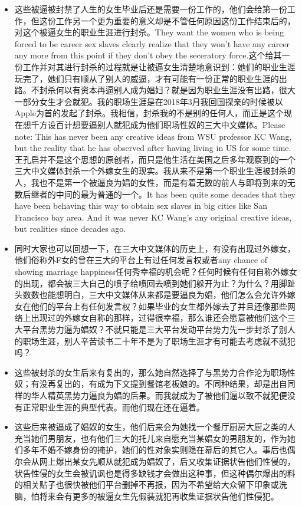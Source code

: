 \documentclass[9pt, b5paper]{article}
\begin{document}
\begin{itemize}
\begin{itemize}
\item 这些被逼被封禁了人生的女生毕业后还是需要一份工作的，他们会给第一份工作，但这份工作另一个更为重要的意义却是不管任何原因这份工作结束后的，对这个被逼女生的职业生涯进行封杀。They want the women who is being forced to be career sex slaves clearly realize that they won't have any career any more from this point if they don't obey the seceratory force.这个给其一份工作并对其进行封杀的过程就是让被逼女生清楚地意识到：她们的职业生涯玩完了，她们只有顺从了别人的威逼，才有可能有一份正常的职业生涯的出路。不封杀何以有资本再逼别人成为娼妇？就是因为职业生涯没有出路，很大一部分女生才会就犯。我的职场生涯是在2018年3月我回国探亲的时候被以Apple为首的发起了封杀。我相信，封杀我的不是别的任何人，而正是这个现在想千方设百计想要逼别人就犯成为他们职场性奴的三大中文媒体。Please note: This has never been any creative ideas from WSU professor KC Wang, but the reality that he has observed after having living in US for some time. 王孔启并不是这个思想的原创者，而只是他生活在美国之后多年观察到的一个三大中文媒体封杀一个外嫁女生的现实。我从来不是第一个职业生涯被封杀的人，我也不是第一个被逼良为娼的女性，而是有着无数的前人与即将到来的无数后继者的中间的最为普通的一个。It has been quite some decades that they have been behaving this way to obtain sex slaves in big cities like San Francisco bay area. And it was never KC Wang's any original creative ideas, but realities since decades ago.
\item 同时大家也可以回想一下，在三大中文媒体的历史上，有没有出现过外嫁女，他们俗称外F女的曾在三大的平台上有过任何发言权或者any chance of showing marriage happiness任何秀幸福的机会呢？任何时候有任何自称外嫁女的出现，都会被三大自己的喷子给喷回去喷到她们躲开为止？为什么？用脚趾头数数也能想明白，三大中文媒体从来都是要逼良为娼，他们怎么会允许外嫁女在他们的平台上有任何发言权？如果毕业的女生都外嫁去了并且还像那些网络上出现过的外嫁女自称的那样，过得很幸福，那么谁还会愿意被他们这个三大平台黑势力逼为娼奴？不就只能是三大平台发动平台势力先一步封杀了别人的职场生涯，别人辛苦读书二十年不是为了职场生涯才有可能去考虑就不就犯吗？
\item 这些被封杀的女生后来有复出的，那么她自然选择了与黑势力合作沦为职场性奴；有没再复出的，有成为下文提到餐馆老板娘的。不同种结果，却是出自同样的华人精英黑势力逼良为娼的后果。而我就成为了被他们逼以致不就犯便没有正常职业生涯的典型代表。而他们现在还在逼着。
\item 这些后来被逼成了娼奴的女生，他们后来会为她找一个餐厅厨房大厨之类的人充当她们男朋友，也有他们三大的托儿来自愿充当某娼女的男朋友的，作为她们多年不婚不嫁身份的掩护，她们的性对象实则隐在幕后的其它人。事后也偶尔会从网上爆出某女先顺从就犯成为娼奴了，后又收集证据状告他们性侵的，状告性侵的女生会被讥讽也是得多缺钱才会做出这种事，但这种偶尔爆出的料的相关贴子也很快被他们平台删掉不再报，因为不希望给大众留下印象或洗脑，怕将来会有更多的被逼女生先假装就犯再收集证据状告他们性侵犯。

\end{itemize}
\end{itemize}
\end{document}
